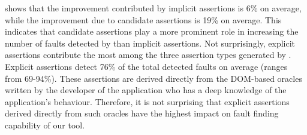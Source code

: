 shows that the improvement contributed by implicit assertions is 6\% on average, while the improvement due to candidate assertions is 19\% on average. This indicates that candidate assertions play a more prominent role in increasing the number of faults detected by \atrina than implicit assertions. Not surprisingly, explicit assertions contribute the most among the three assertion types generated by \atrina. Explicit assertions detect 76\% of the total detected faults on average (ranges from 69-94\%). These assertions are derived directly from the DOM-based oracles written by the developer of the application who has a deep knowledge of the application's behaviour. Therefore, it is not surprising that explicit assertions derived directly from such oracles have the highest impact on fault finding capability of our tool.        

